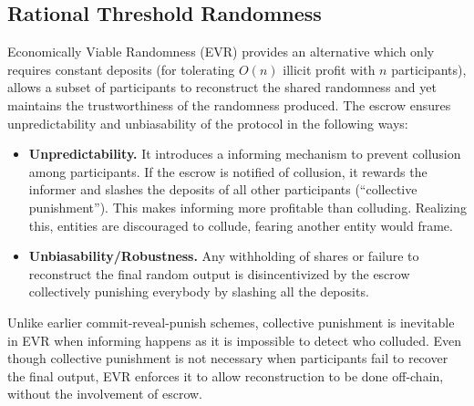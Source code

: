 \documentclass[letterpaper,twocolumn,10pt]{article}
\theoremstyle{definition}
\theoremstyle{remark}
\begin{document}
\subsection{Rational Threshold Randomness}
Economically Viable Randomness (EVR) \cite{david2020economically} provides an alternative which only requires constant deposits (for tolerating $O(n)$ illicit profit with $n$ participants), allows a subset of participants to reconstruct the shared randomness and yet maintains the trustworthiness of the randomness produced. The escrow ensures unpredictability and unbiasability of the protocol in the following ways: 
\begin{itemize}
    \item \textbf{Unpredictability.} It introduces a informing mechanism to prevent collusion among participants. If the escrow is notified of collusion, it rewards the informer and slashes the deposits of all other participants (``collective punishment''). This makes informing more profitable than colluding. Realizing this, entities are discouraged to collude, fearing another entity would frame.
    \item \textbf{Unbiasability/Robustness.} Any withholding of shares or failure to reconstruct the final random output is disincentivized by the escrow collectively punishing everybody by slashing all the deposits.
\end{itemize}

Unlike earlier commit-reveal-punish schemes, collective punishment is inevitable in EVR when informing happens as it is impossible to detect who colluded. Even though collective punishment is not necessary when participants fail to recover the final output, EVR enforces it to allow reconstruction to be done off-chain, without the involvement of escrow. 
\end{document}
